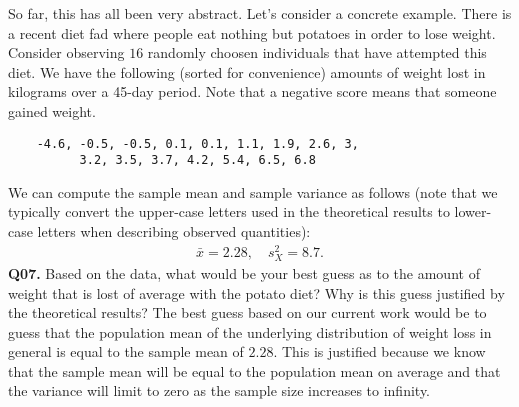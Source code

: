 \documentclass[12pt]{article}
\newcommand{\cblack}{\color{Black}}
\newcommand{\cblue}{\color{MidnightBlue}}
\begin{document}
\cblack
So far, this has all been very abstract. Let's consider a concrete example. 
There is a recent diet fad where people eat nothing but potatoes in order to
lose weight. Consider observing $16$ randomly choosen individuals
that have attempted this diet. We have the following (sorted for convenience)
amounts of weight lost in kilograms over a 45-day period. Note that a negative
score means that someone gained weight.
\begin{verbatim}
    -4.6, -0.5, -0.5, 0.1, 0.1, 1.1, 1.9, 2.6, 3,
          3.2, 3.5, 3.7, 4.2, 5.4, 6.5, 6.8
\end{verbatim}
We can compute the sample mean and sample variance as follows (note that we
typically convert the upper-case letters used in the theoretical results to
lower-case letters when describing observed quantities):
\begin{align*}
\bar{x} = 2.28, \quad s^2_X = 8.7. 
\end{align*}
\textbf{Q07.} Based on the data, what would be your best guess as to the amount
of weight that is lost of average with the potato diet? Why is this guess
justified by the theoretical results? \cblue The best guess based on our current
work would be to guess that the population mean of the underlying distribution of
weight loss in general is equal to the sample mean of $2.28$. This is justified
because we know that the sample mean will be equal to the population mean on
average and that the variance will limit to zero as the sample size increases
to infinity. \cblack
\end{document}
